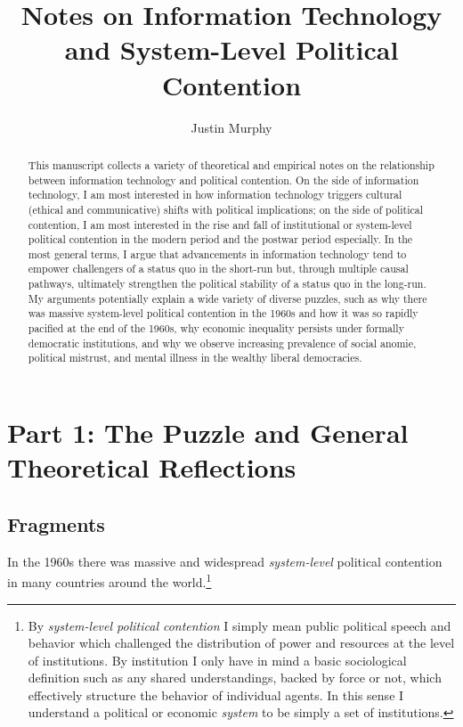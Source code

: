\documentclass[12pt,book]{article}
\title{Notes on Information Technology and System-Level Political Contention}
\author{Justin Murphy}
\date{}
\begin{document}
\maketitle


\begin{abstract} 
This manuscript collects a variety of theoretical and empirical notes on the relationship between information technology and political contention. On the side of information technology, I am most interested in how information technology triggers cultural (ethical and communicative) shifts with political implications; on the side of political contention, I am most interested in the rise and fall of institutional or system-level political contention in the modern period and the postwar period especially. In the most general terms, I argue that advancements in information technology tend to empower challengers of a status quo in the short-run but, through multiple causal pathways, ultimately strengthen the political stability of a status quo in the long-run. My arguments potentially explain a wide variety of diverse puzzles, such as why there was massive system-level political contention in the 1960s and how it was so rapidly pacified at the end of the 1960s, why economic inequality persists under formally democratic institutions, and why we observe increasing prevalence of social anomie, political mistrust, and mental illness in the wealthy liberal democracies.
\end{abstract}

{
\hypersetup{linkcolor=black}
\setcounter{tocdepth}{2}
\tableofcontents
}
\section{Part 1: The Puzzle and General Theoretical
Reflections}\label{part-1-the-puzzle-and-general-theoretical-reflections}

\subsection{Fragments}\label{fragments}

In the 1960s there was massive and widespread \emph{system-level}
political contention in many countries around the world.\footnote{By
  \emph{system-level political contention} I simply mean public
  political speech and behavior which challenged the distribution of
  power and resources at the level of institutions. By institution I
  only have in mind a basic sociological definition such as any shared
  understandings, backed by force or not, which effectively structure
  the behavior of individual agents. In this sense I understand a
  political or economic \emph{system} to be simply a set of
  institutions.}
\end{document}
